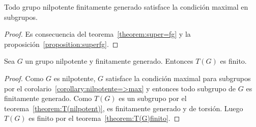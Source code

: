 \begin{corollary}
	\label{corollary:nilpotente=>max}
	Todo grupo nilpotente finitamente generado satisface la condición maximal
	en subgrupos.
\end{corollary}

\begin{proof}
	Es consecuencia del teorema~\ref{theorem:super=fg} y la
	proposición~\ref{proposition:superfg}.
\end{proof}

\begin{theorem}
	Sea $G$ un grupo nilpotente y finitamente generado. Entonces $T(G)$ es
	finito.
\end{theorem}

\begin{proof}
	Como $G$ es nilpotente, $G$ satisface la condición maximal para subgrupos
	por el corolario~\ref{corollary:nilpotente=>max} y entonces
	todo subgrupo de $G$ es finitamente generado. Como $T(G)$ es un subgrupo por el teorema~\ref{theorem:T(nilpotent)}, 
	es finitamente generado y de torsión. Luego $T(G)$ es finito por el
	teorema~\ref{theorem:T(G)finito}.
\end{proof}




